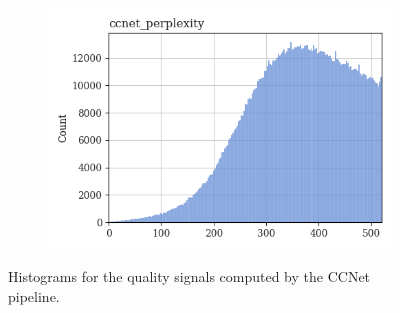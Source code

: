 \documentclass{article}
\begin{document}
\begin{figure}
\begin{subfigure}[b]{0.32\textwidth}
     \end{subfigure}
     \hfill
     \begin{subfigure}[b]{0.32\textwidth}
         \centering
         \includegraphics[width=\textwidth]{figures/quality_signals/ccnet_perplexity.png}
     \end{subfigure}
    \caption{Histograms for the quality signals computed by the CCNet~\cite{wenzek2019ccnet} pipeline.}
    \label{fig:ccnet-qs-dist}
\end{figure}
\end{document}
